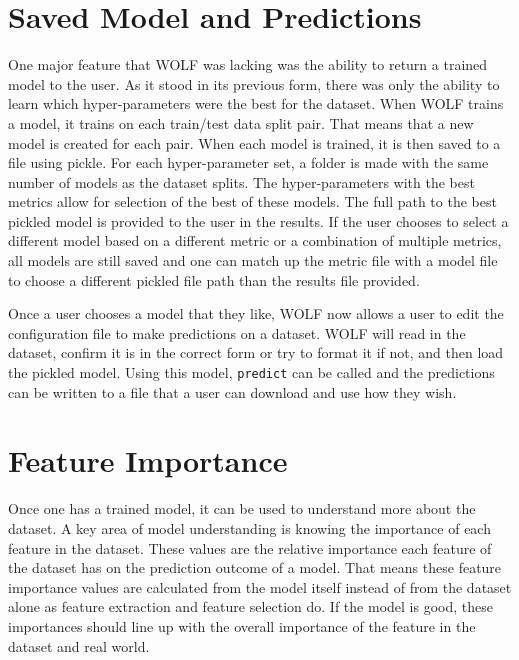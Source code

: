 \section*{Saved Model and Predictions}
One major feature that WOLF was lacking was the ability to return a trained model to the user. As it stood in its previous form, there was only the ability to learn which hyper-parameters were the best for the dataset. When WOLF trains a model, it trains on each train/test data split pair. That means that a new model is created for each pair. When each model is trained, it is then saved to a file using pickle. For each hyper-parameter set, a folder is made with the same number of models as the dataset splits. The hyper-parameters with the best metrics allow for selection of the best of these models. The full path to the best pickled model is provided to the user in the results. If the user chooses to select a different model based on a different metric or a combination of multiple metrics, all models are still saved and one can match up the metric file with a model file to choose a different pickled file path than the results file provided.

Once a user chooses a model that they like, WOLF now allows a user to edit the configuration file to make predictions on a dataset. WOLF will read in the dataset, confirm it is in the correct form or try to format it if not, and then load the pickled model. Using this model, {\tt predict} can be called and the predictions can be written to a file that a user can download and use how they wish.

\section*{Feature Importance}
Once one has a trained model, it can be used to understand more about the dataset. A key area of model understanding is knowing the importance of each feature in the dataset. These values are the relative importance each feature of the dataset has on the prediction outcome of a model. That means these feature importance values are calculated from the model itself instead of from the dataset alone as feature extraction and feature selection do. If the model is good, these importances should line up with the overall importance of the feature in the dataset and real world. 


